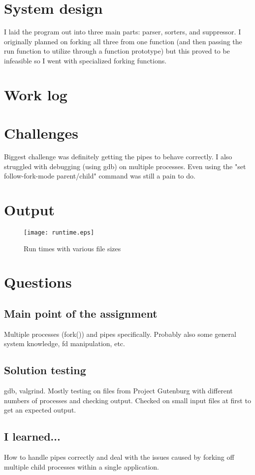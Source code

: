\documentclass[letterpaper,10pt,titlepage]{article}
\begin{document}
\section{System design}
I laid the program out into three main parts: parser, sorters, and suppressor.
I originally planned on forking all three from one function (and then passing the
run function to utilize through a function prototype) but this proved to be
infeasible so I went with specialized forking functions.

\section{Work log}


\section{Challenges}
Biggest challenge was definitely getting the pipes to behave correctly. I also
struggled with debugging (using gdb) on multiple processes. Even using the
"set follow-fork-mode parent/child" command was still a pain to do.

\section{Output}
\begin{figure}[H]
	\caption{Run times with various file sizes}
	\texttt{[image: runtime.eps]}
\end{figure}

\section{Questions}
\subsection{Main point of the assignment}
Multiple processes (fork()) and pipes specifically. Probably also some general
system knowledge, fd manipulation, etc.

\subsection{Solution testing}
gdb, valgrind. Mostly testing on files from Project Gutenburg with different numbers
of processes and checking output. Checked on small input files at first to get an
expected output.

\subsection{I learned...}
How to handle pipes correctly and deal with the issues caused by forking off multiple
child processes within a single application.
\end{document}
